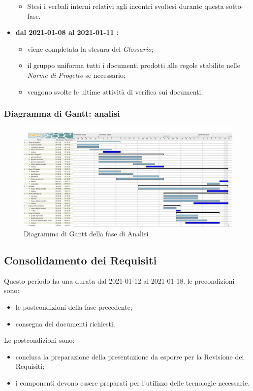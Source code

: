 \begin{itemize}
\begin{itemize}
		\item Stesi i verbali interni relativi agli incontri svoltesi durante questa sotto-fase.
	\end{itemize}
	\item \textbf{dal 2021-01-08 al 2021-01-11 :}
	\begin{itemize}
		\item viene completata la stesura del \textit{Glossario};
		\item il gruppo uniforma tutti i documenti prodotti alle regole stabilite nelle \textit{Norme di Progetto} se necessario;
		\item vengono svolte le ultime attività di verifica sui documenti.
	\end{itemize}
\end{itemize}

\subsubsection{Diagramma di Gantt: analisi}
\begin{figure}[H]
    \centering
    \includegraphics[scale = 0.25]{components/img/Analisi.jpg}
    \caption{Diagramma di Gantt della fase di Analisi}
    \label{fig:Diagramma di Gantt, fase di Analisi}
\end{figure}

\newpage
\subsection{Consolidamento dei Requisiti}
Questo periodo ha una durata dal 2021-01-12 al 2021-01-18.
le precondizioni sono:
\begin{itemize}
	\item le postcondizioni della fase precedente;
	\item consegna dei documenti richiesti.
\end{itemize}
Le postcondizioni sono:
\begin{itemize}
	\item conclusa la preparazione della presentazione da esporre per la Revisione dei Requisiti;
	\item i componenti devono essere preparati per l'utilizzo delle tecnologie necessarie.
\end{itemize}
